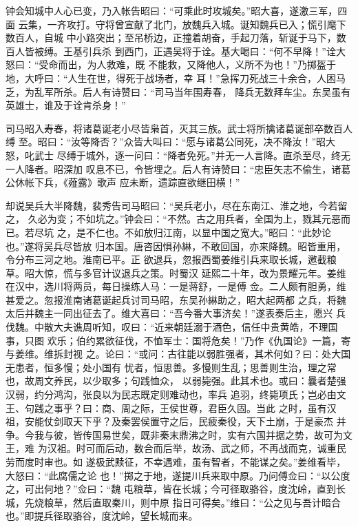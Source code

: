 钟会知城中人心已变，乃入帐告昭曰：“可乘此时攻城矣。”昭大喜，遂激三军，四面
云集，一齐攻打。守将曾宣献了北门，放魏兵入城。诞知魏兵已入；慌引麾下数百人，自城
中小路突出；至吊桥边，正撞着胡奋，手起刀落，斩诞于马下，数百人皆被缚。王基引兵杀
到西门，正遇吴将于诠。基大喝曰：“何不早降！”诠大怒曰：“受命而出，为人救难，既
不能救，又降他人，义所不为也！”乃掷盔于地，大呼曰：“人生在世，得死于战场者，幸
耳！”急挥刀死战三十余合，人困马乏，为乱军所杀。后人有诗赞曰：“司马当年围寿春，
降兵无数拜车尘。东吴虽有英雄士，谁及于诠肯杀身！”

司马昭入寿春，将诸葛诞老小尽皆枭首，灭其三族。武士将所擒诸葛诞部卒数百人缚
至。昭曰：“汝等降否？”众皆大叫曰：“愿与诸葛公同死，决不降汝！”昭大怒，叱武士
尽缚于城外，逐一问曰：“降者免死。”并无一人言降。直杀至尽，终无一人降者。昭深加
叹息不已，令皆埋之。后人有诗赞曰：“忠臣矢志不偷生，诸葛公休帐下兵，《薤露》歌声
应未断，遗踪直欲继田横！”

却说吴兵大半降魏，裴秀告司马昭曰：“吴兵老小，尽在东南江、淮之地，今若留之，
久必为变；不如坑之。”钟会曰：“不然。古之用兵者，全国为上，戮其元恶而已。若尽坑
之，是不仁也。不如放归江南，以显中国之宽大。”昭曰：“此妙论也。”遂将吴兵尽皆放
归本国。唐咨因惧孙綝，不敢回国，亦来降魏。昭皆重用，令分布三河之地。淮南已平。正
欲退兵，忽报西蜀姜维引兵来取长城，邀截粮草。昭大惊，慌与多官计议退兵之策。时蜀汉
延熙二十年，改为景耀元年。姜维在汉中，选川将两员，每日操练人马：一是蒋舒，一是傅
佥。二人颇有胆勇，维甚爱之。忽报淮南诸葛诞起兵讨司马昭，东吴孙綝助之，昭大起两都
之兵，将魏太后并魏主一同出征去了。维大喜曰：“吾今番大事济矣！”遂表奏后主，愿兴
兵伐魏。中散大夫谯周听知，叹曰：“近来朝廷溺于酒色，信任中贵黄皓，不理国事，只图
欢乐；伯约累欲征伐，不恤军士：国将危矣！”乃作《仇国论》一篇，寄与姜维。维拆封视
之。论曰：“或问：古往能以弱胜强者，其术何如？曰：处大国无患者，恒多慢；处小国有
忧者，恒思善。多慢则生乱；思善则生治，理之常也，故周文养民，以少取多；句践恤众，
以弱毙强。此其术也。或曰：曩者楚强汉弱，约分鸿沟，张良以为民志既定则难动也，率兵
追羽，终毙项氏；岂必由文王、句践之事乎？曰：商、周之际，王侯世尊，君臣久固。当此
之时，虽有汉祖，安能仗剑取天下乎？及秦罢侯置守之后，民疲秦役，天下土崩，于是豪杰
并争。今我与彼，皆传国易世矣，既非秦末鼎沸之时，实有六国并据之势，故可为文王，难
为汉祖。时可而后动，数合而后举，故汤、武之师，不再战而克，诚重民劳而度时审也。如
遂极武黩征，不幸遇难，虽有智者，不能谋之矣。”姜维看毕，大怒曰：“此腐儒之论
也！”掷之于地，遂提川兵来取中原。乃问傅佥曰：“以公度之，可出何地？”佥曰：“魏
屯粮草，皆在长城；今可径取骆谷，度沈岭，直到长城，先烧粮草，然后直取秦川，则中原
指日可得矣。”维曰：“公之见与吾计暗合也。”即提兵径取骆谷，度沈岭，望长城而来。

